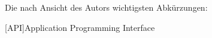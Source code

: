 \section*{\nameofacronymstable}
Die nach Ansicht des Autors wichtigsten Abkürzungen:
\bigskip

\begin{adjustwidth}{1.5em}{}
\begin{acronym}[API] %
	
	[API]{Application Programming Interface}
	
\end{acronym}	
\end{adjustwidth}
